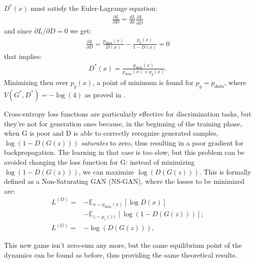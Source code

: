 $D^*(x)$ must satisfy the Euler-Lagrange equation:
\begin{align*}
	\frac{\partial L}{\partial D} = \frac{d L}{d x} \frac{\partial L}{\partial \dot{D}}
\end{align*}
and since $\partial L / \partial \dot{D} = 0$ we get:
\begin{align*}
	\frac{\partial L}{\partial D} = \frac{p_{data}(x)}{D(x)} - \frac{p_g(x)}{1-D(x)} = 0
\end{align*}
that implies:
\begin{align*}
	D^*(x) = \frac{p_{data}(x)}{p_{data}(x) + p_g(x)}.
\end{align*}
Minimizing then over $p_g(x)$, a point of minimum is found for $p_g = p_{data}$, where $V(G^*,D^*)=-\log(4)$ as proved in \cite{NIPS2014_5423}.

Cross-entropy loss functions are particularly effective for discrimination tasks, but they're not for generation ones because, in the beginning of the training phase, when G is poor and D is able to correctly recognize generated samples, $\log(1-D(G(z)))$ \textit{saturates} to zero, thus resulting in a poor gradient for backpropagation. The learning in that case is too slow, but this problem can be avoided changing the loss function for G: instead of minimizing $\log(1-D(G(z)))$, we can maximize $\log(D(G(z)))$. This is formally defined as a Non-Saturating GAN (NS-GAN), where the losses to be minimized are:
\begin{equation*}
\begin{split}
L^{(D)} = &-\mathbb{E}_{x \sim p_{data}(x)}[\log D(x)]\\
&- \mathbb{E}_{z \sim p_{z}(z)}[\log (1-D(G(z)))];\\
L^{(G)} = &- \log(D(G(z))),
\end{split}
\end{equation*}

This new game isn't zero-sum any more, but the same equilibrium point of the dynamics can be found as before, thus providing the same theoretical results.

